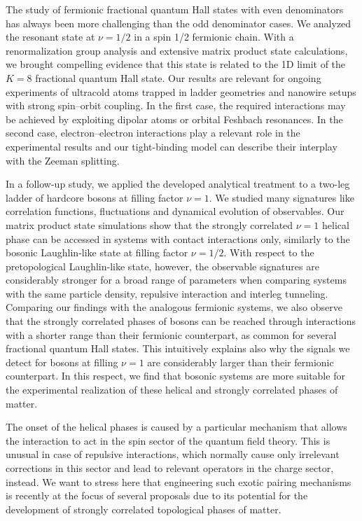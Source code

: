 The study of fermionic fractional quantum Hall states with even denominators has always been more challenging than the odd denominator cases.
We analyzed the resonant state at $\nu=1/2$ in a spin 1/2 fermionic chain.
With a renormalization group analysis and extensive matrix product state calculations, we brought compelling evidence that this state is related to the 1D limit of the $K=8$ fractional quantum Hall state.
Our results are relevant for ongoing experiments of ultracold atoms trapped in ladder geometries and nanowire setups with strong spin–orbit coupling.
In the first case, the required interactions may be achieved by exploiting dipolar atoms or orbital Feshbach resonances.
In the second case, electron–electron interactions play a relevant role in the experimental results and our tight-binding model can describe their interplay with the Zeeman splitting.

In a follow-up study, we applied the developed analytical treatment to a two-leg ladder of hardcore bosons at filling factor $\nu=1$.
We studied many signatures like correlation functions, fluctuations and dynamical evolution of observables.
Our matrix product state simulations show that the strongly correlated $\nu=1$ helical phase can be accessed in systems with contact interactions only, similarly to the bosonic Laughlin-like state at filling factor $\nu = 1/2$.
With respect to the pretopological Laughlin-like state, however, the observable signatures are considerably stronger for a broad range of parameters when comparing systems with the same particle density, repulsive interaction and interleg tunneling.
Comparing our findings with the analogous fermionic systems, we also observe that the strongly correlated phases of bosons can be reached through interactions with a shorter range than their fermionic counterpart, as common for several fractional quantum Hall states.
This intuitively explains also why the signals we detect for bosons at filling $\nu = 1$ are considerably larger than their fermionic counterpart.
In this respect, we find that bosonic systems are more suitable for the experimental realization of these helical and strongly correlated phases of matter.

The onset of the helical phases is caused by a particular mechanism that allows the interaction to act in the spin sector of the quantum field theory.
This is unusual in case of repulsive interactions, which normally cause only irrelevant corrections in this sector and lead to relevant operators in the charge sector, instead.
We want to stress here that engineering such exotic pairing mechanisms is recently at the focus of several proposals due to its potential for the development of strongly correlated topological phases of matter.

